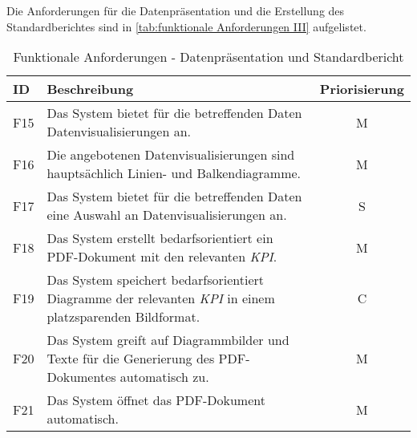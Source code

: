 Die Anforderungen für die Datenpräsentation und die Erstellung des Standardberichtes sind in \autoref{tab:funktionale Anforderungen III} aufgelistet.
\begingroup
\setlength{\tabcolsep}{10pt} %
\renewcommand{\arraystretch}{1.25} 
\begin{table}[h]
    \centering
    \begin{adjustbox}{max width=\textwidth}
    \begin{tabular}{lp{15cm}c}
       \toprule
       \textbf{ID}          & \textbf{Beschreibung} &\textbf{Priorisierung}\\
       \midrule
        F15                              &Das System bietet für die betreffenden Daten Datenvisualisierungen an. & M\\
        F16                              &Die angebotenen Datenvisualisierungen sind hauptsächlich Linien- und Balkendiagramme. & M\\
        F17                              &Das System bietet für die betreffenden Daten eine Auswahl an Datenvisualisierungen an. & S\\
        F18                              &Das System erstellt bedarfsorientiert ein PDF-Dokument mit den relevanten \textit{\acrshort{KPI}}. & M\\
        F19                              &Das System speichert bedarfsorientiert Diagramme der relevanten \textit{\acrshort{KPI}} in einem platzsparenden Bildformat. & C\\
        F20                              &Das System greift auf Diagrammbilder und Texte für die Generierung des PDF-Dokumentes automatisch zu. &M\\
        F21                              &Das System öffnet das PDF-Dokument automatisch. & M\\
        \bottomrule
    \end{tabular}
    \end{adjustbox}
    \caption{%
        Funktionale Anforderungen - Datenpräsentation und Standardbericht
    }
    \label{tab:funktionale Anforderungen III}
    \end{table}
\endgroup



